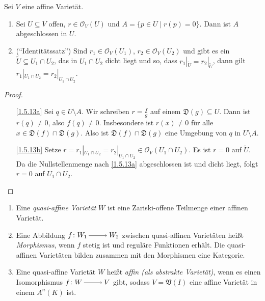 \documentclass[a4paper,12pt]{scrbook}
\theoremstyle{keinenummern} %
\theoremstyle{mitnummern}
\theoremstyle{unserbeweis}
\newtheorem{proof}{Beweis}
\def\V{\mathfrak{V}}
\def\O{\mathcal{O}}
\newcommand{\D}{\mathfrak{D}}
\newcommand{\restrict}[1]{|_{#1}}
\newcommand{\ra}{\raisebox{-1pt}{\tikz{\draw[thin,shorten >=3pt, ->] (0,0) node{\hspace*{-2pt}} -- node{} (1,0);}}\penalty1000\relax}
\begin{document}
\begin{bem}\label{1.5.13}
  Sei $V$ eine affine Varietät.
  \begin{enumerate}
  \item{} Sei $U\subseteq V$ offen, $r\in\O_V(U)$ und $A=\{p\in U\mid r(p)=0\}$. Dann ist $A$ abgeschlossen in $U$.
  \item{} (\enquote{Identitätssatz}) Sind $r_1\in\O_V(U_1)$, $r_2\in\O_V(U_2)$ und gibt es ein $\tilde{U}\subseteq
    U_1\cap U_2$, das in $U_1\cap U_2$ dicht liegt und so, dass $r_1\restrict{\tilde{U}}=r_2\restrict{\tilde{U}}$, dann gilt
    $r_1\restrict{U_1\cap U_2}=r_2\restrict{U_1\cap U_2}$.
  \end{enumerate}
\end{bem}
\begin{proof}
  \begin{enumerate}
  \item[\ref{1.5.13a}] Sei $q\in U\setminus A$. Wir schreiben $r=\frac{f}{g}$ auf einem $\D(g)\subseteq U$. Dann ist $r(q)\neq0$,
    also $f(q)\neq0$. Insbesondere ist $r(x)\neq0$ für alle $x\in \D(f)\cap \D(g)$. Also ist $\D(f)\cap \D(g)$ eine Umgebung von $q$
    in $U\setminus A$.
  \item[\ref{1.5.13b}] Setze $r=r_1\restrict{U_1\cap U_2}=r_2\restrict{U_1\cap U_2}\in \O_V(U_1\cap U_2)$. Es ist $r=0$ auf
    $\tilde{U}$. Da die Nullstellenmenge nach \ref{1.5.13a} abgeschlossen ist und dicht liegt, folgt $r=0$ auf $U_1\cap U_2$.
  \end{enumerate}
\end{proof}

\begin{db}\label{1.5.14}
  \begin{enumerate}
  \item{} Eine \emph{quasi-affine Varietät} $W$ ist eine Zariski-offene Teilmenge einer affinen Varietät.
  \item{} Eine Abbildung $f\colon W_1\ra W_2$ zwischen quasi-affinen Varietäten heißt \emph{Morphismus}, wenn $f$
    stetig ist und reguläre Funktionen erhält. Die quasi-affinen Varietäten bilden zusammen mit den Morphismen eine Kategorie.
  \item{} Eine quasi-affine Varietät $W$ heißt \emph{affin (als abstrakte Varietät)}, wenn es einen Isomorphismus
    $f\colon W\ra V$ gibt, sodass $V=\V(I)$ eine affine Varietät in einem $A^n(K)$ ist.
  \end{enumerate}
\end{db}
\end{document}
